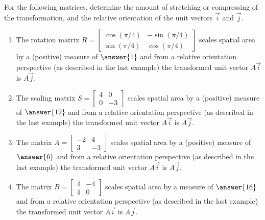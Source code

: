 \documentclass{ximera}
\begin{document}
\begin{example}
    For the following matrices, determine the amount of stretching or compressing of the transformation, and the relative orientation of the unit vectors $\vec{i}$ and $\vec{j}$. 

    \begin{enumerate}
        \item The rotation matrix $R=\begin{bmatrix}
            \cos(\pi/4)& -\sin(\pi/4)\\ \sin(\pi/4) & \cos(\pi/4)
        \end{bmatrix}$ scales spatial area by a (positive) measure of $\answer{1}$ and from a relative orientation perspective (as described in the last example) the transformed unit vector $A\vec{i}$ is  $A\vec{j}$.
        \item The scaling matrix $S=\begin{bmatrix}
            4& 0\\ 0 & -3
        \end{bmatrix}$ scales spatial area by a (positive) measure of $\answer{12}$ and from a relative orientation perspective (as described in the last example) the transformed unit vector $A\vec{i}$ is  $A\vec{j}$.
        \item The matrix $A=\begin{bmatrix}
            -2& 4\\ 3 & -3
        \end{bmatrix}$ scales spatial area by a (positive) measure of $\answer{6}$ and from a relative orientation perspective (as described in the last example) the transformed unit vector $A\vec{i}$ is  $A\vec{j}$.
        \item The matrix $B=\begin{bmatrix}
            4& -4\\ 4 & 0
        \end{bmatrix}$ scales spatial area by a measure of $\answer{16}$ and from a relative orientation perspective (as described in the last example) the transformed unit vector $A\vec{i}$ is  $A\vec{j}$.
    \end{enumerate}
\end{example}
\end{document}
